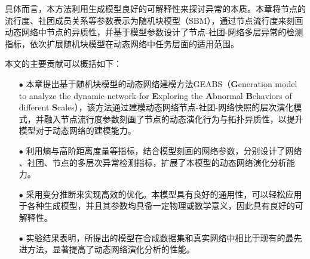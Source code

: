 

具体而言，本方法利用生成模型良好的可解释性来探讨异常的本质。本章将节点的流行度、社团成员关系等参数表示为随机块模型（SBM），通过节点流行度来刻画动态网络中节点的异质性，并基于模型参数设计了节点-社团-网络多层异常的检测指标，依次扩展随机块模型在动态网络中任务层面的适用范围。

本文的主要贡献可以概括如下：

\begin{itemize} 
    \item[$\bullet$] 本章提出基于随机块模型的动态网络建模方法GEABS（\textbf{G}eneration model to analyze the dynamic network for \textbf{E}xploring the \textbf{A}bnormal \textbf{B}ehaviors of different \textbf{S}cales），该方法通过建模动态网络节点-社团-网络快照的层次演化模式，并融入节点流行度参数刻画了节点的动态演化行为与拓扑异质性，以提升模型对于动态网络的建模能力。
    \item[$\bullet$] 利用熵与高阶距离度量等指标，结合模型刻画的网络参数，分别设计了网络 、社团、节点的多层次异常检测指标，扩展了本模型的动态网络演化分析能力。
    \item[$\bullet$] 采用变分推断来实现高效的优化。本模型具有良好的通用性，可以轻松应用于各种生成模型，并且其参数均具备一定物理或数学意义，因此具有良好的可解释性。 
    \item[$\bullet$] 实验结果表明，所提出的模型在合成数据集和真实网络中相比于现有的最先进方法，显著提高了动态网络演化分析的性能。
\end{itemize}


